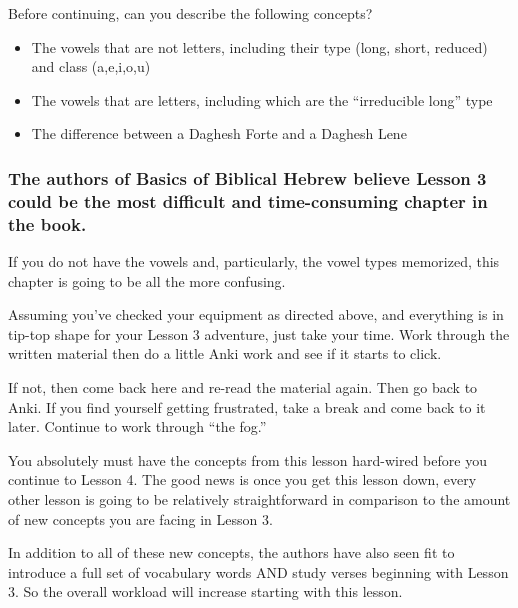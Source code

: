 \documentclass[
]{turabian-researchpaper}
\providecommand{\tightlist}{%
  \setlength{\itemsep}{0pt}\setlength{\parskip}{0pt}}
\begin{document}
Before continuing, can you describe the following concepts?

\begin{itemize}
\tightlist
\item
  The vowels that are not letters, including their type (long, short, reduced) and class (a,e,i,o,u)
\item
  The vowels that are letters, including which are the ``irreducible long'' type
\item
  The difference between a Daghesh Forte and a Daghesh Lene
\end{itemize}

\hypertarget{the-authors-of-basics-of-biblical-hebrew-believe-lesson-3-could-be-the-most-difficult-and-time-consuming-chapter-in-the-book.}{%
\subsubsection*{\texorpdfstring{\textbf{The authors of Basics of Biblical Hebrew believe Lesson 3 could be the most difficult and time-consuming chapter in the book.}}{The authors of Basics of Biblical Hebrew believe Lesson 3 could be the most difficult and time-consuming chapter in the book.}}\label{the-authors-of-basics-of-biblical-hebrew-believe-lesson-3-could-be-the-most-difficult-and-time-consuming-chapter-in-the-book.}}

If you do not have the vowels and, particularly, the vowel types memorized, this chapter is going to be all the more confusing.

Assuming you've checked your equipment as directed above, and everything is in tip-top shape for your Lesson 3 adventure, just take your time. Work through the written material then do a little Anki work and see if it starts to click.

If not, then come back here and re-read the material again. Then go back to Anki. If you find yourself getting frustrated, take a break and come back to it later. Continue to work through ``the fog.''

You absolutely must have the concepts from this lesson hard-wired before you continue to Lesson 4. The good news is once you get this lesson down, every other lesson is going to be relatively straightforward in comparison to the amount of new concepts you are facing in Lesson 3.

In addition to all of these new concepts, the authors have also seen fit to introduce a full set of vocabulary words AND study verses beginning with Lesson 3. So the overall workload will increase starting with this lesson.
\end{document}
